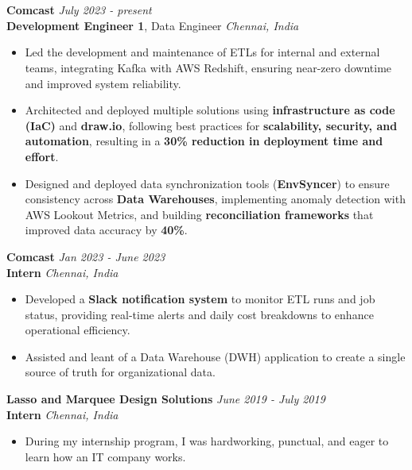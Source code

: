 \documentclass[a4paper,10pt]{article}
\begin{document}
\section{\scshape\color{Fuchsia}{\faUserTie\ \textbf EXPERIENCE}}
\textbf{Comcast} \href{https://corporate.comcast.com/}{} \hfill
\textit{July 2023 - present} \\
\textbf{Development Engineer 1}, Data Engineer \hfill \textit{Chennai, India}
\vspace{-2mm}
\begin{itemize}
    \item Led the development and maintenance of ETLs for internal and external teams, integrating Kafka with AWS Redshift, ensuring near-zero downtime and improved system reliability.
    \vspace{-2mm}
    \item Architected and deployed multiple solutions using \textbf{infrastructure as code (IaC)} and \textbf{draw.io}, following best practices for \textbf{scalability, security, and automation}, resulting in a \textbf{30\% reduction in deployment time and effort}.
    \vspace{-2mm}
    \item Designed and deployed data synchronization tools (\textbf{EnvSyncer}) to ensure consistency across \textbf{Data Warehouses}, implementing anomaly detection with AWS Lookout Metrics, and building \textbf{reconciliation frameworks} that improved data accuracy by \textbf{40\%}.
\end{itemize}
\vspace{-2mm}
\textbf{Comcast} \href{https://drive.google.com/file/d/1pad_OUtVNHKm3s1Kb-_xwyZAXJBjz7gX/view?usp=sharing}{} \hfill \textit{Jan 2023 - June 2023} \\
\textbf{Intern} \hfill \textit{Chennai, India}
\vspace{-2mm}
\begin{itemize}
    \item Developed a \textbf{Slack notification system} to monitor ETL runs and job status, providing real-time alerts and daily cost breakdowns to enhance operational efficiency.
    \vspace{-2mm}
    \item Assisted and leant of a Data Warehouse (DWH) application to create a single source of truth for organizational data.
\end{itemize}
\vspace{-2mm}
\textbf{Lasso and Marquee Design Solutions} \href{https://drive.google.com/file/d/1fMTBkQUhU6_34D5mxVZRf7wBHGMJPdVi/view?usp=sharing}{} \hfill \textit{June 2019 - July 2019} \\
\textbf{Intern} \hfill \textit{Chennai, India}
\vspace{-2mm}
\begin{itemize}
    \item During my internship program, I was hardworking, punctual, and eager to learn how an IT company works.
\end{itemize}
\end{document}
